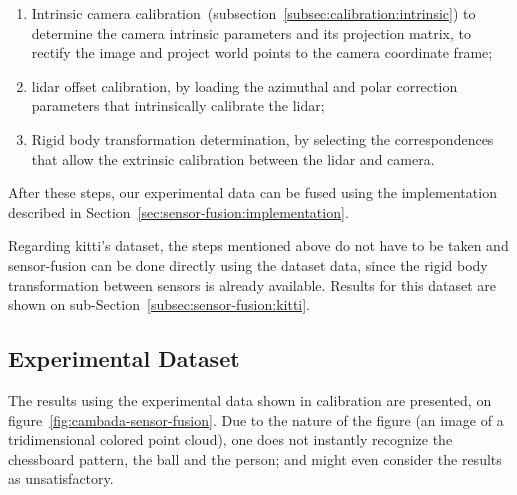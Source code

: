 \begin{enumerate}
	\item Intrinsic camera calibration~(subsection~\ref{subsec:calibration:intrinsic}) to determine the camera intrinsic parameters and its projection matrix, to rectify the image and project world points to the camera coordinate frame;
	\item \ac{lidar} offset calibration, by loading the azimuthal and polar correction parameters that intrinsically calibrate the \ac{lidar};
	\item Rigid body transformation determination, by selecting the correspondences that allow the extrinsic calibration between the \ac{lidar} and camera.
\end{enumerate}

After these steps, our experimental data can be fused using the implementation described in Section~\ref{sec:sensor-fusion:implementation}.

Regarding \ac{kitti}'s dataset, the steps mentioned above do not have to be taken and sensor-fusion can be done directly using the dataset data, since the rigid body transformation between sensors is already available. Results for this dataset are shown on sub-Section~\ref{subsec:sensor-fusion:kitti}.

\subsection{Experimental Dataset}
\label{subsec:sensor-fusion:experimental-dataset}
The results using the experimental data shown in calibration are presented, on figure~\ref{fig:cambada-sensor-fusion}. Due to the nature of the figure (an image of a tridimensional colored point cloud), one does not instantly recognize the chessboard pattern, the ball and the person; and might even consider the results as unsatisfactory. 

